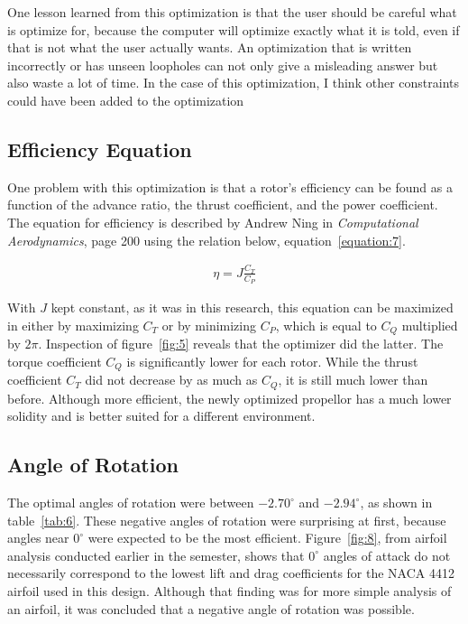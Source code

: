 \documentclass[journal ]{new-aiaa}
\begin{document}
One lesson learned from this optimization is that the user should be careful what is optimize for, because the computer will optimize exactly what it is told, even if that is not what the user actually wants. An optimization that is written incorrectly or has unseen loopholes can not only give a misleading answer but also waste a lot of time. In the case of this optimization, I think other constraints could have been added to the optimization

\subsection{Efficiency Equation}

One problem with this optimization is that a rotor's efficiency can be found as a function of the advance ratio, the thrust coefficient, and the power coefficient. The equation for efficiency is described by Andrew Ning in \emph{Computational Aerodynamics}, page 200 \cite{ComAer} using the relation below, equation~\eqref{equation:7}.

\begin{equation}
	\begin{aligned}
	\label{equation:7}
	\eta = J \frac{C_{T}}{C_{P}}
	\end{aligned}
\end{equation}

With $J$ kept constant, as it was in this research, this equation can be maximized in either by maximizing $C_{T}$ or by minimizing $C_{P}$, which is equal to $C_{Q}$ multiplied by $2 \pi$. Inspection of figure~\eqref{fig:5} reveals that the optimizer did the latter. The torque coefficient $C_{Q}$ is significantly lower for each rotor. While the thrust coefficient $C_{T}$ did not decrease by as much as $C_{Q}$, it is still much lower than before. Although more efficient, the newly optimized propellor has a much lower solidity and is better suited for a different environment.

\subsection{Angle of Rotation}

The optimal angles of rotation were between $-2.70^{\circ}$ and $-2.94^{\circ}$, as shown in table~\eqref{tab:6}. These negative angles of rotation were surprising at first, because angles near $0^{\circ}$ were expected to be the most efficient. Figure~\eqref{fig:8}, from airfoil analysis conducted earlier in the semester, shows that $0^{\circ}$ angles of attack do not necessarily correspond to the lowest lift and drag coefficients for the NACA 4412 airfoil used in this design. Although that finding was for more simple analysis of an airfoil, it was concluded that a negative angle of rotation was possible.
\end{document}
